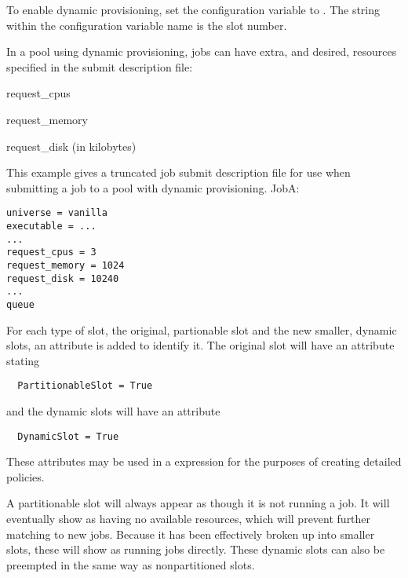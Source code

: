 To enable dynamic provisioning, 
set the  configuration variable 
to .
The string  within the configuration variable name
is the slot number.

In a pool using dynamic provisioning, 
jobs can have extra, and desired, resources specified in the submit
description file:
\begin{description}
  \item{request\_cpus}
  \item{request\_memory}
  \item{request\_disk (in kilobytes)}
\end{description}

This example gives a truncated job submit description file for use when submitting a job to a pool with dynamic provisioning.
JobA:
\begin{verbatim}
universe = vanilla
executable = ...
...
request_cpus = 3
request_memory = 1024
request_disk = 10240
...
queue 
\end{verbatim}

For each type of slot,
the original, partionable slot and the new smaller, dynamic slots,
an attribute is added to identify it.
The original slot will have an attribute stating 
\begin{verbatim}
  PartitionableSlot = True
\end{verbatim}
and the dynamic slots will have an attribute 
\begin{verbatim}
  DynamicSlot = True
\end{verbatim}
These attributes may be used in a  expression for 
the purposes of creating detailed policies.

A partitionable slot will always appear as though it is not running a job.
It will eventually show as having no available resources, 
which will prevent further matching to new jobs.
Because it has been effectively broken up into smaller slots,
these will show as running jobs directly.
These dynamic slots can also be preempted in the same way as 
nonpartitioned slots.

